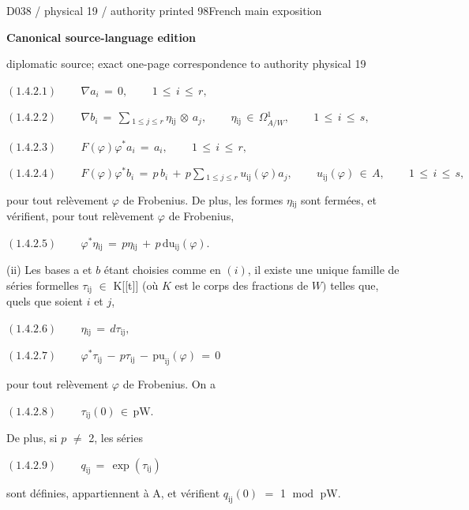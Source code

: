 \documentclass[9pt]{article}
\newcommand{\CanonText}[1]{\par{\fontsize{8.0}{9.35}\selectfont\RaggedRight #1\par}\vspace{2.2pt}}
\newcommand{\CanonDisplay}[1]{\par\vspace{1.2pt}\begin{center}{\fontsize{7.2}{8.4}\selectfont\(\displaystyle #1\)}\end{center}\vspace{1.2pt}}
\newcommand{\LayerTitle}{Canonical source-language edition}
\begin{document}
\noindent\begin{minipage}[t][\dimexpr\textheight-5pt\relax][t]{\textwidth}
{\sffamily\fontsize{7.3}{8.2}\selectfont\color{Quiet} D038 / physical 19 / authority printed 98\hfill French main exposition}
\par{}\vspace{4.5pt}
{\sffamily\fontsize{10.4}{11.6}\selectfont\bfseries\color{Accent} \LayerTitle}
\par{\sffamily\fontsize{6.7}{7.7}\selectfont\color{Quiet} diplomatic source; exact one-page correspondence to authority physical 19}
\vspace{5pt}
\CanonDisplay{(1.4.2.1)\qquad\,\nabla{}a_{i}\,=\,0,\qquad\,1\,\leq{}\,i\,\leq{}\,r,}
\CanonDisplay{(1.4.2.2)\qquad\,\nabla{}b_{i}\,=\,\sum{}_{1\leq{}j\leq{}r}\,\eta{}_{\mathrm{ij}}\,\otimes{}\,a_{j},\qquad\,\eta{}_{\mathrm{ij}}\,\in{}\,\Omega{}^{1}_{A/W},\qquad\,1\,\leq{}\,i\,\leq{}\,s,}
\CanonDisplay{(1.4.2.3)\qquad\,F(\varphi{})\varphi{}^{*}a_{i}\,=\,a_{i},\qquad\,1\,\leq{}\,i\,\leq{}\,r,}
\CanonDisplay{(1.4.2.4)\qquad\,F(\varphi{})\varphi{}^{*}b_{i}\,=\,p\,b_{i}\,+\,p\sum{}_{1\leq{}j\leq{}r}\,u_{\mathrm{ij}}(\varphi{})a_{j},\qquad\,u_{\mathrm{ij}}(\varphi{})\,\in{}\,A,\qquad\,1\,\leq{}\,i\,\leq{}\,s,}
\CanonText{pour tout relèvement \(\varphi{}\) de Frobenius. De plus, les formes \(\eta{}_{\mathrm{ij}}\) sont fermées, et vérifient, pour tout relèvement \(\varphi{}\) de Frobenius,}
\CanonDisplay{(1.4.2.5)\qquad\,\varphi{}^{*}\eta{}_{\mathrm{ij}}\,=\,p\eta{}_{\mathrm{ij}}\,+\,p\,\text{du}_{\mathrm{ij}}(\varphi{}).}
\CanonText{(ii) Les bases a et \(b\) étant choisies comme en \((i)\), il existe une unique famille de séries formelles \(\tau{}_{\mathrm{ij}}\) \(\in{}\) K[[t]] (où \(K\) est le corps des fractions de \(W)\) telles que, quels que soient \(i\) et \(j\),}
\CanonDisplay{(1.4.2.6)\qquad\,\eta{}_{\mathrm{ij}}\,=\,d\tau{}_{\mathrm{ij}},}
\CanonDisplay{(1.4.2.7)\qquad\,\varphi{}^{*}\tau{}_{\mathrm{ij}}\,-\,p\tau{}_{\mathrm{ij}}\,-\,\text{pu}_{\mathrm{ij}}(\varphi{})\,=\,0}
\CanonText{pour tout relèvement \(\varphi{}\) de Frobenius. On a}
\CanonDisplay{(1.4.2.8)\qquad\,\tau{}_{\mathrm{ij}}(0)\,\in{}\,\text{pW}.}
\CanonText{De plus, si \(p\) \(\neq{}\) 2, les séries}
\CanonDisplay{(1.4.2.9)\qquad\,q_{\mathrm{ij}}\,=\,\operatorname{exp}(\tau{}_{\mathrm{ij}})}
\CanonText{sont définies, appartiennent à A, et vérifient \(q_{\mathrm{ij}}(0)\) \(=\) 1 \(\operatorname{mod}\) pW.}

\end{minipage}
\end{document}

